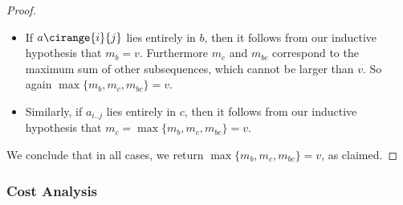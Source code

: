 \begin{flex}
\begin{proof}
\begin{itemize}
\item 
If $a\cirange{i}{j}$ lies entirely in $b$, then it follows from our
inductive hypothesis that $m_b = v$.  Furthermore $m_c$ and $m_{bc}$
correspond to the maximum sum of other subsequences, which cannot be
larger than $v$. 
%
So again $\max\{m_b, m_c, m_{bc}\} = v$.

\item Similarly, if $a_{i..j}$ lies entirely in $c$, then it follows
  from our inductive hypothesis that $m_c = \max\{m_b, m_c, m_{bc}\} =
  v$.

\end{itemize}

We conclude that in all cases, we return $\max\{m_b, m_c, m_{bc}\} = v$,
as claimed.
\end{proof}
\end{flex}

\subsubsection{Cost Analysis}
\label{sec:mcss::dc::first::cost}

